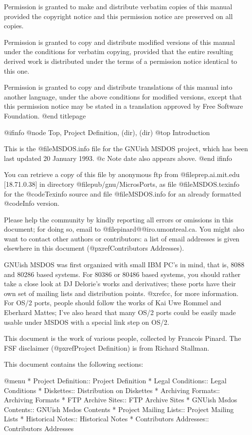 Permission is granted to make and distribute verbatim copies of
this manual provided the copyright notice and this permission notice
are preserved on all copies.

Permission is granted to copy and distribute modified versions of this
manual under the conditions for verbatim copying, provided that the entire
resulting derived work is distributed under the terms of a permission
notice identical to this one.

Permission is granted to copy and distribute translations of this manual
into another language, under the above conditions for modified versions,
except that this permission notice may be stated in a translation approved
by Free Software Foundation.
@end titlepage

@ifinfo
@node Top, Project Definition, (dir), (dir)
@top Introduction

This is the @file{MSDOS.info} file for the GNUish MSDOS project, which
has been last updated 20 January 1993.
@c Note date also appears above.
@end ifinfo

You can retrieve a copy of this file by anonymous ftp from
@file{prep.ai.mit.edu} [18.71.0.38] in directory
@file{pub/gnu/MicrosPorts}, as file @file{MSDOS.texinfo} for the
@code{Texinfo} source and file @file{MSDOS.info} for an already
formatted @code{Info} version.

Please help the community by kindly reporting all errors or omissions in
this document; for doing so, email to @file{pinard@@iro.umontreal.ca}.
You might also want to contact other authors or contributors: a list of
email addresses is given elsewhere in this document (@pxref{Contributors
Addresses}).

GNUish MSDOS was first organized with small IBM PC's in mind, that is,
8088 and 80286 based systems.  For 80386 or 80486 based systems, you
should rather take a close look at DJ Delorie's works and derivatives;
these ports have their own set of mailing lists and distribution points.
@xref{cc}, for more information.  For OS/2 ports, people should follow
the works of Kai Uwe Rommel and Eberhard Mattes; I've also heard that
many OS/2 ports could be easily made usable under MSDOS with a special
link step on OS/2.

This document is the work of various people, collected by Francois
Pinard.  The FSF disclaimer (@pxref{Project Definition}) is from Richard
Stallman.

This document contains the following sections:

@menu
* Project Definition::          Project Definition
* Legal Conditions::            Legal Conditions
* Diskettes::                   Distribution on Diskettes
* Archiving Formats::           Archiving Formats
* FTP Archive Sites::           FTP Archive Sites
* GNUish Msdos Contents::       GNUish Msdos Contents
* Project Mailing Lists::       Project Mailing Lists
* Historical Notes::            Historical Notes
* Contributors Addresses::      Contributors Addresses

